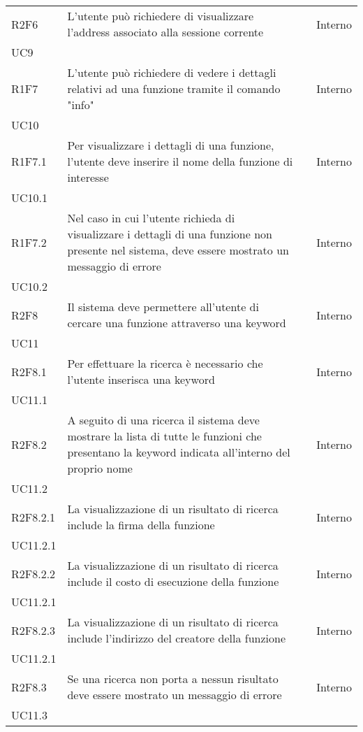 \begin{longtable}{ 
		>{\centering}p{} 
		>{}p{} 
		>{\centering}p{}
		>{\centering}p{} }
	R2F6 & L'utente può richiedere di visualizzare l'address 
			associato alla sessione corrente 										& \de & Interno \\ UC9 \tabularnewline
	
	R1F7 & L'utente può richiedere di vedere i dettagli relativi ad una funzione
		tramite il comando "info"													& \ob & Interno \\ UC10 \tabularnewline
	R1F7.1 & Per visualizzare i dettagli di una funzione, l'utente deve inserire 
		il nome della funzione di interesse											& \ob & Interno \\ UC10.1 \tabularnewline
	R1F7.2 & Nel caso in cui l'utente richieda di visualizzare i dettagli di una 
		funzione non presente nel sistema, deve essere mostrato un messaggio di
		errore															 			& \ob & Interno \\ UC10.2 \tabularnewline
	
	R2F8 & Il sistema deve permettere all'utente di cercare una funzione 
		attraverso una keyword 														& \de & Interno \\ UC11 \tabularnewline
	R2F8.1 & Per effettuare la ricerca è necessario che l'utente inserisca 
		una keyword 																& \de & Interno \\ UC11.1 \tabularnewline
	R2F8.2 & A seguito di una ricerca il sistema deve mostrare la lista di
	 tutte le funzioni che presentano la keyword indicata 
	 all'interno del proprio nome													& \de & Interno \\ UC11.2 \tabularnewline
	R2F8.2.1 & La visualizzazione di un risultato di ricerca include
		 la firma della funzione													& \de & Interno \\ UC11.2.1 \tabularnewline
  	R2F8.2.2 & La visualizzazione di un risultato di ricerca include
		  il costo di esecuzione della funzione										& \de & Interno \\ UC11.2.1 \tabularnewline
  	R2F8.2.3 & La visualizzazione di un risultato di ricerca include
		  l'indirizzo del creatore della funzione									& \de & Interno \\ UC11.2.1 \tabularnewline
	R2F8.3 & Se una ricerca non porta a nessun risultato deve essere mostrato un 
		messaggio di errore 														& \de & Interno \\ UC11.3 	\tabularnewline	
	

\end{longtable}
